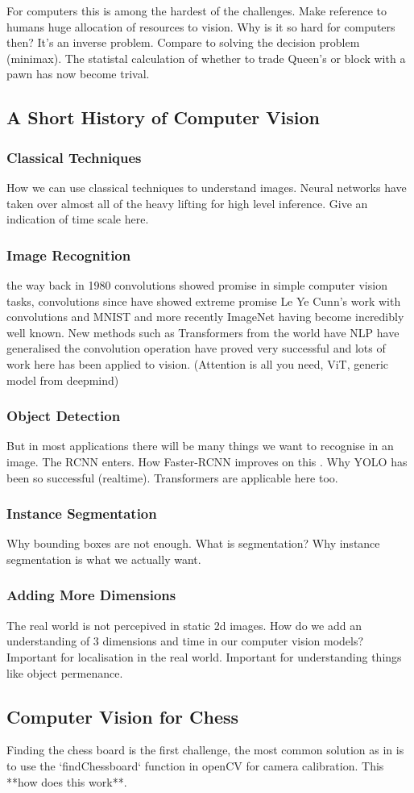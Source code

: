 For computers this is among the hardest of the challenges.  
Make reference to humans huge allocation of resources to vision. \cite{}
Why is it so hard for computers then? It's an inverse problem. 
Compare to solving the decision problem (minimax).  
The statistal calculation of whether to trade Queen's or block with a pawn has now become trival.  

\subsection{A Short History of Computer Vision}
\subsubsection{Classical Techniques}
How we can use classical techniques to understand images.  Neural networks have taken over almost all of the heavy lifting for high level inference.
Give an indication of time scale here.
\subsubsection{Image Recognition}
the way back in 1980 \cite{} convolutions showed promise in simple computer vision tasks, 
convolutions since have showed extreme promise \cite{}
Le Ye Cunn's work with convolutions \cite{} and MNIST \cite{} and more recently ImageNet \cite{} having become incredibly well known.
New methods such as Transformers from the world have NLP have generalised the convolution operation have proved 
very successful and lots of work here has been applied to vision. \cite{} \cite{} \cite{} (Attention is all you need, ViT, generic model from deepmind)
\subsubsection{Object Detection}
But in most applications there will be many things we want to recognise in an image.  The RCNN \cite{} enters.  How Faster-RCNN improves on this \cite{}.
Why YOLO \cite{} has been so successful (realtime).  Transformers are applicable here too.
\subsubsection{Instance Segmentation}
Why bounding boxes are not enough.  What is segmentation? Why instance segmentation is what we actually want. \cite{}
\subsubsection{Adding More Dimensions}
The real world is not percepived in static 2d images.  How do we add an understanding of 3 dimensions and time in our computer vision models? \cite{}
Important for localisation in the real world.  Important for understanding things like object permenance.


\subsection{Computer Vision for Chess}
Finding the chess board is the first challenge, the most common solution as in \cite{} 
is to use the `findChessboard` function in openCV for camera calibration.  This **how does 
this work**.  